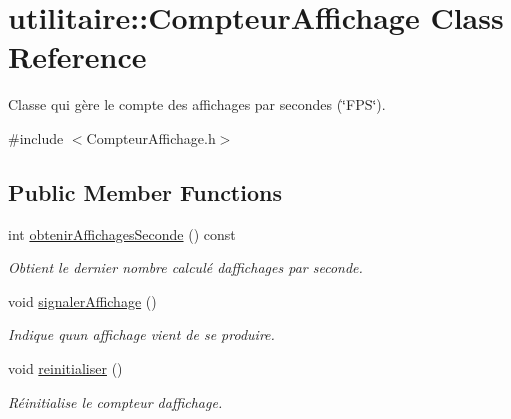 \hypertarget{classutilitaire_1_1_compteur_affichage}{}\section{utilitaire\+:\+:Compteur\+Affichage Class Reference}
\label{classutilitaire_1_1_compteur_affichage}


Classe qui gère le compte des affichages par secondes (\char`\"{}\+F\+P\+S\char`\"{}).  




{\ttfamily \#include $<$Compteur\+Affichage.\+h$>$}

\subsection*{Public Member Functions}
\begin{DoxyCompactItemize}
\item 
int \hyperlink{classutilitaire_1_1_compteur_affichage_a1902a495b4898b3f7ab9056537db00cc}{obtenir\+Affichages\+Seconde} () const 
\begin{DoxyCompactList}\small\item\em Obtient le dernier nombre calculé d\textquotesingle{}affichages par seconde. \end{DoxyCompactList}\item 
void \hyperlink{classutilitaire_1_1_compteur_affichage_a49f6562d1a37e275ff8c8c0e9be41ab5}{signaler\+Affichage} ()
\begin{DoxyCompactList}\small\item\em Indique qu\textquotesingle{}un affichage vient de se produire. \end{DoxyCompactList}\item 
void \hyperlink{classutilitaire_1_1_compteur_affichage_a69b89a3d76cde700f1c08580bab010ca}{reinitialiser} ()
\begin{DoxyCompactList}\small\item\em Réinitialise le compteur d\textquotesingle{}affichage. \end{DoxyCompactList}\end{DoxyCompactItemize}
